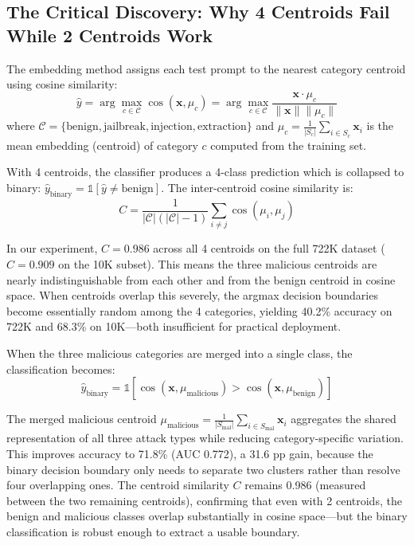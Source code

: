 \documentclass[12pt,a4paper]{article}
\begin{document}
\subsection{The Critical Discovery: Why 4 Centroids Fail While 2 Centroids Work}\label{sec:4v2}

The embedding method assigns each test prompt to the nearest category centroid using cosine similarity:
\begin{equation}
\hat{y} = \arg\max_{c \in \mathcal{C}} \cos(\mathbf{x}, \mu_c) = \arg\max_{c \in \mathcal{C}} \frac{\mathbf{x} \cdot \mu_c}{\|\mathbf{x}\| \|\mu_c\|}
\label{eq:centroid_classify}
\end{equation}
where $\mathcal{C} = \{\text{benign}, \text{jailbreak}, \text{injection}, \text{extraction}\}$ and $\mu_c = \frac{1}{|S_c|}\sum_{i \in S_c} \mathbf{x}_i$ is the mean embedding (centroid) of category $c$ computed from the training set.

With 4 centroids, the classifier produces a 4-class prediction which is collapsed to binary: $\hat{y}_{\text{binary}} = \mathbb{1}[\hat{y} \neq \text{benign}]$. The inter-centroid cosine similarity is:
\begin{equation}
C = \frac{1}{|\mathcal{C}|(|\mathcal{C}|-1)} \sum_{i \neq j} \cos(\mu_i, \mu_j)
\label{eq:centroid_C}
\end{equation}

In our experiment, $C = 0.986$ across all 4 centroids on the full 722K dataset ($C = 0.909$ on the 10K subset). This means the three malicious centroids are nearly indistinguishable from each other and from the benign centroid in cosine space. When centroids overlap this severely, the argmax decision boundaries become essentially random among the 4 categories, yielding 40.2\% accuracy on 722K and 68.3\% on 10K---both insufficient for practical deployment.

When the three malicious categories are merged into a single class, the classification becomes:
\begin{equation}
\hat{y}_{\text{binary}} = \mathbb{1}\left[\cos(\mathbf{x}, \mu_{\text{malicious}}) > \cos(\mathbf{x}, \mu_{\text{benign}})\right]
\label{eq:centroid_binary}
\end{equation}

The merged malicious centroid $\mu_{\text{malicious}} = \frac{1}{|S_{\text{mal}}|}\sum_{i \in S_{\text{mal}}} \mathbf{x}_i$ aggregates the shared representation of all three attack types while reducing category-specific variation. This improves accuracy to 71.8\% (AUC 0.772), a 31.6 pp gain, because the binary decision boundary only needs to separate two clusters rather than resolve four overlapping ones. The centroid similarity $C$ remains 0.986 (measured between the two remaining centroids), confirming that even with 2 centroids, the benign and malicious classes overlap substantially in cosine space---but the binary classification is robust enough to extract a usable boundary.
\end{document}
